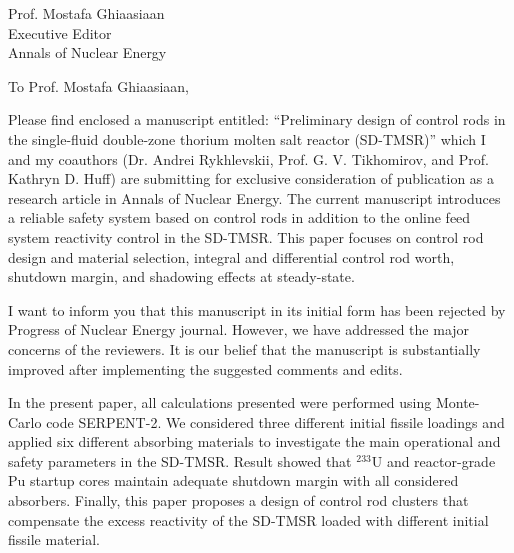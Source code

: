 \documentclass[11pt]{letter} %
\newcommand{\RecipientName}{Prof. Mostafa Ghiaasiaan\xspace}
\newcommand{\RecipientAddress}{Executive Editor\\Annals of Nuclear Energy}
\begin{document}
	
	
	
	\begin{letter}{\RecipientName\\
			\RecipientAddress\xspace}
		
		\address{O. Ashraf\\
			oabdelaziz@mephi.ru\\
			osama.ashraf@edu.asu.edu.eg\\
			Institute of Nuc. Physics and Eng.\\
			National Research Nuclear University\\
			Moscow, Russia, 115409}
		
		
		\opening{To \RecipientName,}
		
		Please find enclosed a manuscript entitled: ``Preliminary design of control rods in the single-fluid double-zone thorium molten salt reactor (SD-TMSR)'' which I and my coauthors (Dr. Andrei Rykhlevskii, Prof. G. V. Tikhomirov, and Prof. Kathryn D. Huff) are submitting for exclusive consideration of publication as a research article in Annals of Nuclear Energy. The current manuscript introduces a reliable safety system based on control rods in addition to the online feed system reactivity control in the SD-TMSR. This paper focuses on control rod design and material selection, integral and differential control rod worth, shutdown margin, and shadowing effects at steady-state.
		
		I want to inform you that this manuscript in its initial form has been rejected by Progress of Nuclear Energy journal. However, we have addressed the major concerns of the reviewers. It is our belief that the manuscript is substantially improved after implementing the suggested comments and edits.
		
		In the present paper, all calculations presented were performed using Monte-Carlo code SERPENT-2. We considered three different initial fissile loadings and applied six different absorbing materials to investigate the main operational and safety parameters in the SD-TMSR. Result showed that $^{233}$U and reactor-grade Pu startup cores maintain adequate shutdown margin with all considered absorbers. Finally, this paper proposes a design of control rod clusters that compensate the excess reactivity of the SD-TMSR loaded with different initial fissile material.
		

\end{letter}
\end{document}
